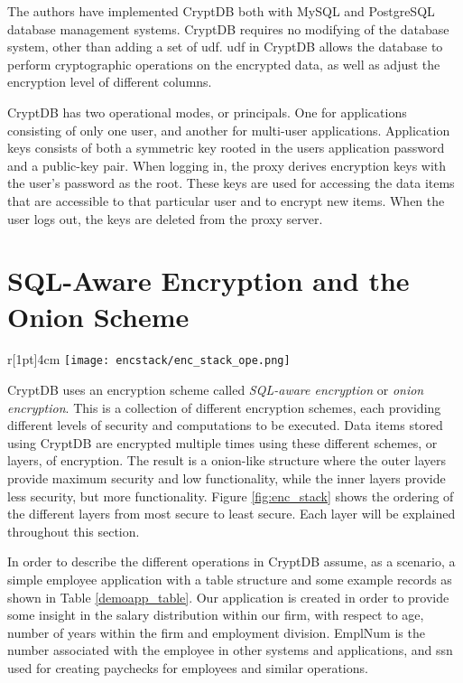 The authors \citep{CryptDB_Main_Paper} have implemented CryptDB both with MySQL and PostgreSQL database management systems. CryptDB requires no modifying of the database system, other than adding a set of \Gls{udf}. \Gls{udf} in CryptDB allows the database to perform cryptographic operations on the encrypted data, as well as adjust the encryption level of different columns.

CryptDB has two operational modes, or principals. One for applications consisting of only one user, and another for multi-user applications. Application keys consists of both a symmetric key rooted in the users application password and a public-key pair. When logging in, the proxy derives encryption keys with the user's password as the root. These keys are used for accessing the data items that are accessible to that particular user and to encrypt new items. When the user logs out, the keys are deleted from the proxy server.



\section{SQL-Aware Encryption and the Onion Scheme}
\label{sec:sqlaware}

\begin{wrapfigure}[17]{r}[1pt]{4cm}
\centering
\texttt{[image: encstack/enc\_stack\_ope.png]}
\caption{Ordering of the different encryption layers based on the security they provide.}
\label{fig:enc_stack}
\end{wrapfigure}

CryptDB uses an encryption scheme called \emph{SQL-aware encryption} or \textit{onion encryption}. This is a collection of different encryption schemes, each providing different levels of security and computations to be executed. Data items stored using CryptDB are encrypted multiple times using these different schemes, or layers, of encryption. The result is a onion-like structure where the outer layers provide maximum security and low functionality, while the inner layers provide less security, but more functionality. Figure \ref{fig:enc_stack} shows the ordering of the different layers from most secure to least secure. Each layer will be explained throughout this section.

In order to describe the different operations in CryptDB  assume, as a scenario, a simple employee application with a table structure and some example records as shown in Table \ref{demoapp_table}. Our application is created in order to provide some insight in the salary distribution within our firm, with respect to age, number of years within the firm and employment division. EmplNum is the number associated with the employee in other systems and applications, and \gls{ssn} used for creating paychecks for employees and similar operations.

